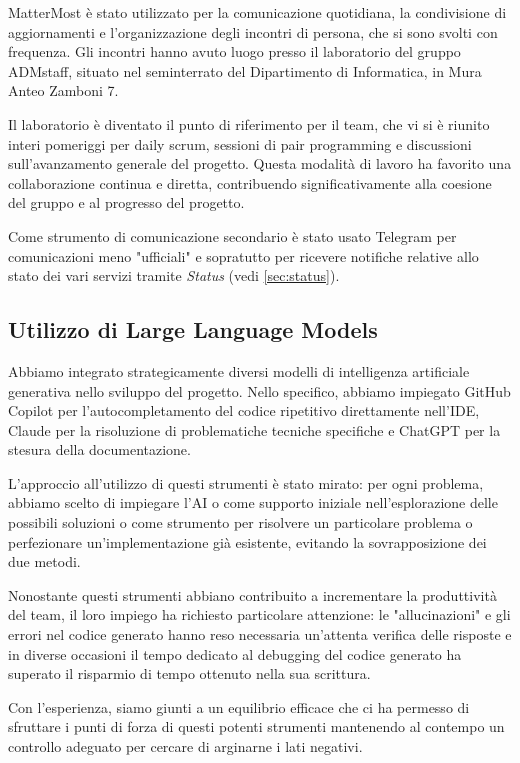 \documentclass{article}
\begin{document}
MatterMost è stato utilizzato per la comunicazione quotidiana, la condivisione di aggiornamenti e l'organizzazione degli incontri di persona, 
che si sono svolti con frequenza. Gli incontri hanno avuto luogo presso il laboratorio del gruppo ADMstaff, situato nel seminterrato del 
Dipartimento di Informatica, in Mura Anteo Zamboni 7.

Il laboratorio è diventato il punto di riferimento per il team, che vi si è riunito interi pomeriggi per daily scrum, sessioni di pair programming 
e discussioni sull'avanzamento generale del progetto. Questa modalità di lavoro ha favorito una collaborazione continua e diretta, contribuendo 
significativamente alla coesione del gruppo e al progresso del progetto.

Come strumento di comunicazione secondario è stato usato Telegram per comunicazioni meno "ufficiali" e sopratutto per ricevere notifiche relative 
allo stato dei vari servizi tramite \textit{Status} (vedi \ref{sec:status}).

\subsection{Utilizzo di Large Language Models}

Abbiamo integrato strategicamente diversi modelli di intelligenza artificiale generativa nello sviluppo del progetto. Nello specifico, abbiamo 
impiegato GitHub Copilot per l'autocompletamento del codice ripetitivo direttamente nell'IDE, Claude per la risoluzione di problematiche tecniche 
specifiche e ChatGPT per la stesura della documentazione.

L'approccio all'utilizzo di questi strumenti è stato mirato: per ogni problema, abbiamo scelto di impiegare l'AI o come supporto iniziale 
nell'esplorazione delle possibili soluzioni o come strumento per risolvere un particolare problema o perfezionare un'implementazione già esistente, 
evitando la sovrapposizione dei due metodi.

Nonostante questi strumenti abbiano contribuito a incrementare la produttività del team, il loro impiego ha richiesto particolare attenzione: le 
"allucinazioni" e gli errori nel codice generato hanno reso necessaria un'attenta verifica delle risposte e in diverse occasioni il tempo dedicato 
al debugging del codice generato ha superato il risparmio di tempo ottenuto nella sua scrittura.

Con l'esperienza, siamo giunti a un equilibrio efficace che ci ha permesso di sfruttare i punti di forza di questi potenti strumenti mantenendo al 
contempo un controllo adeguato per cercare di arginarne i lati negativi.
\end{document}
